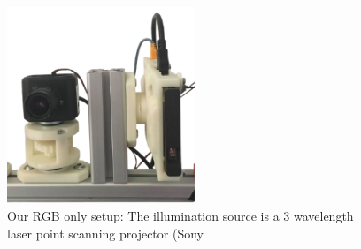 \begin{figure}
    \includegraphics[width=0.5\textwidth]{resources/images/setup.png}
    \caption{Our RGB only setup: The illumination source is a 3 wavelength  laser point scanning projector  (Sony}
\end{figure}